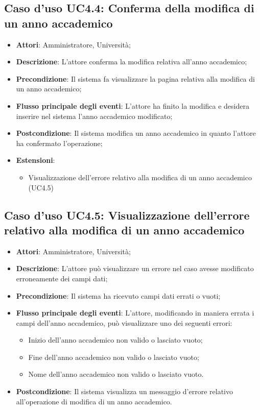 \subsection{Caso d'uso \texorpdfstring{UC4.4}{UC4.4}: Conferma della modifica di un anno accademico}
\begin{itemize}
\item \textbf{Attori}: Amministratore, Università;
\item \textbf{Descrizione}: L'attore conferma la modifica relativa all'anno accademico;
\item \textbf{Precondizione}: Il sistema fa visualizzare la pagina relativa alla modifica di un anno accademico;
\item \textbf{Flusso principale degli eventi}: L'attore ha finito la modifica e desidera inserire nel sistema l'anno accademico modificato;
\item \textbf{Postcondizione}: Il sistema modifica un anno accademico in quanto l'attore ha confermato l'operazione;
\item \textbf{Estensioni}:
\begin{itemize}
\item Visualizzazione dell'errore relativo alla modifica di un anno accademico (UC4.5)
\end{itemize}
\end{itemize}
\subsection{Caso d'uso \texorpdfstring{UC4.5}{UC4.5}: Visualizzazione dell'errore relativo alla modifica di un anno accademico}
\begin{itemize}
\item \textbf{Attori}: Amministratore, Università;
\item \textbf{Descrizione}: L'attore può visualizzare un errore nel caso avesse modificato erroneamente dei campi dati;
\item \textbf{Precondizione}: Il sistema ha ricevuto campi dati errati o vuoti;
\item \textbf{Flusso principale degli eventi}: L'attore, modificando in maniera errata i campi dell'anno accademico, può visualizzare uno dei seguenti errori: 
\begin{itemize}
\item Inizio dell'anno accademico non valido o lasciato vuoto; 
\item Fine dell'anno accademico non valido o lasciato vuoto; 
\item Nome dell'anno accademico non valido o lasciato vuoto. 
\end{itemize}
\item \textbf{Postcondizione}: Il sistema visualizza un messaggio d'errore relativo all'operazione di modifica di un anno accademico.
\end{itemize}
